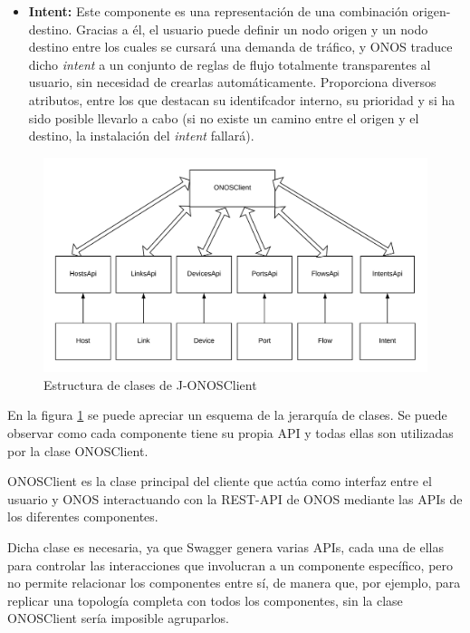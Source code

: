 \begin{itemize}
	\item \textbf{Intent:} Este componente es una representación de una combinación origen-destino. Gracias a él, el usuario puede definir un nodo origen y un nodo destino entre los cuales se cursará una demanda de tráfico, y \ac{ONOS} traduce dicho \textit{intent} a un conjunto de reglas de flujo totalmente transparentes al usuario, sin necesidad de crearlas automáticamente. Proporciona diversos atributos, entre los que destacan su identifcador interno, su prioridad y si ha sido posible llevarlo a cabo (si no existe un camino entre el origen y el destino, la instalación del \textit{intent} fallará).
	
\end{itemize}


\begin{figure}[!ht]
	\centering
	\includegraphics[width=1\linewidth]{imagenes/ONOSClient}
	\caption{Estructura de clases de J-ONOSClient}
	\label{fig:onosclient}
\end{figure}

En la figura \ref{fig:onosclient} se puede apreciar un esquema de la jerarquía de clases. Se puede observar como cada componente tiene su propia \ac{API} y todas ellas son utilizadas por la clase ONOSClient.

ONOSClient es la clase principal del cliente que actúa como interfaz entre el usuario y \ac{ONOS} interactuando con la \ac{REST}-\ac{API} de \ac{ONOS} mediante las \acp{API} de los diferentes componentes.

Dicha clase es necesaria, ya que Swagger genera varias \acp{API}, cada una de ellas para controlar las interacciones que involucran a un componente específico, pero no permite relacionar los componentes entre sí, de manera que, por ejemplo, para replicar una topología completa con todos los componentes, sin la clase ONOSClient sería imposible agruparlos.

